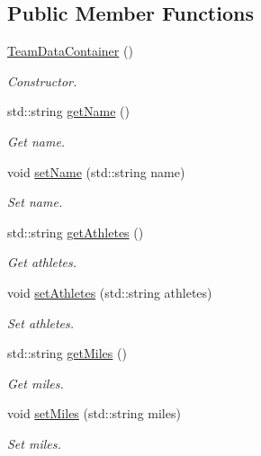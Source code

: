 \subsection*{Public Member Functions}
\begin{DoxyCompactItemize}
\item 
\mbox{\hyperlink{classTeamDataContainer_a33e2abdd44e4a58ce37641483de8887d}{Team\+Data\+Container}} ()
\begin{DoxyCompactList}\small\item\em Constructor. \end{DoxyCompactList}\item 
std\+::string \mbox{\hyperlink{classTeamDataContainer_aed1b673750d8228deffc689462366d9f}{get\+Name}} ()
\begin{DoxyCompactList}\small\item\em Get name. \end{DoxyCompactList}\item 
void \mbox{\hyperlink{classTeamDataContainer_aadf07ec4e7d39230b3c5754707f40c01}{set\+Name}} (std\+::string name)
\begin{DoxyCompactList}\small\item\em Set name. \end{DoxyCompactList}\item 
std\+::string \mbox{\hyperlink{classTeamDataContainer_a7093d9aed16e643f524462cc0e8ef8e5}{get\+Athletes}} ()
\begin{DoxyCompactList}\small\item\em Get athletes. \end{DoxyCompactList}\item 
void \mbox{\hyperlink{classTeamDataContainer_a1f2285027f3d693a2922f43276960e47}{set\+Athletes}} (std\+::string athletes)
\begin{DoxyCompactList}\small\item\em Set athletes. \end{DoxyCompactList}\item 
std\+::string \mbox{\hyperlink{classTeamDataContainer_a957dba1bc878b59ffb15c6aed6d02a75}{get\+Miles}} ()
\begin{DoxyCompactList}\small\item\em Get miles. \end{DoxyCompactList}\item 
void \mbox{\hyperlink{classTeamDataContainer_a18cfbddc60db01ad1434401a8f8c892a}{set\+Miles}} (std\+::string miles)
\begin{DoxyCompactList}\small\item\em Set miles. \end{DoxyCompactList}\item 

\end{DoxyCompactItemize}
